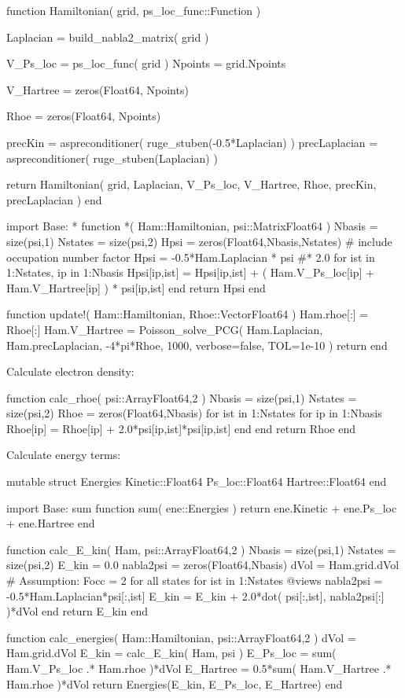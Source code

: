 \begin{juliacode}
function Hamiltonian( grid, ps_loc_func::Function )
    
  Laplacian = build_nabla2_matrix( grid )
    
  V_Ps_loc = ps_loc_func( grid )
  Npoints = grid.Npoints
    
  V_Hartree = zeros(Float64, Npoints)

  Rhoe = zeros(Float64, Npoints)

  precKin = aspreconditioner( ruge_stuben(-0.5*Laplacian) )
  precLaplacian = aspreconditioner( ruge_stuben(Laplacian) )
    
  return Hamiltonian( grid, Laplacian, V_Ps_loc, V_Hartree, Rhoe, precKin, precLaplacian )
end
\end{juliacode}


\begin{juliacode}
import Base: *
function *( Ham::Hamiltonian, psi::Matrix{Float64} )
  Nbasis = size(psi,1)
  Nstates = size(psi,2)
  Hpsi = zeros(Float64,Nbasis,Nstates)
  # include occupation number factor
  Hpsi = -0.5*Ham.Laplacian * psi #* 2.0
  for ist in 1:Nstates, ip in 1:Nbasis
    Hpsi[ip,ist] = Hpsi[ip,ist] + ( Ham.V_Ps_loc[ip] + Ham.V_Hartree[ip] ) * psi[ip,ist]
  end
  return Hpsi
end
\end{juliacode}

\begin{juliacode}
function update!( Ham::Hamiltonian, Rhoe::Vector{Float64} )
  Ham.rhoe[:] = Rhoe[:]
  Ham.V_Hartree = Poisson_solve_PCG(
      Ham.Laplacian, Ham.precLaplacian, -4*pi*Rhoe, 1000,
      verbose=false, TOL=1e-10
  )
  return
end
\end{juliacode}

Calculate electron density:
\begin{juliacode}
function calc_rhoe( psi::Array{Float64,2} )
  Nbasis = size(psi,1)
  Nstates = size(psi,2)
  Rhoe = zeros(Float64,Nbasis)
  for ist in 1:Nstates
    for ip in 1:Nbasis
      Rhoe[ip] = Rhoe[ip] + 2.0*psi[ip,ist]*psi[ip,ist]
    end
  end
  return Rhoe
end
\end{juliacode}

Calculate energy terms:
\begin{juliacode}
mutable struct Energies
  Kinetic::Float64
  Ps_loc::Float64
  Hartree::Float64
end

import Base: sum
function sum( ene::Energies )
  return ene.Kinetic + ene.Ps_loc + ene.Hartree
end

function calc_E_kin( Ham, psi::Array{Float64,2} )
  Nbasis = size(psi,1)
  Nstates = size(psi,2)
  E_kin = 0.0
  nabla2psi = zeros(Float64,Nbasis)
  dVol = Ham.grid.dVol
  # Assumption: Focc = 2 for all states
  for ist in 1:Nstates
    @views nabla2psi = -0.5*Ham.Laplacian*psi[:,ist]
    E_kin = E_kin + 2.0*dot( psi[:,ist], nabla2psi[:] )*dVol
  end
  return E_kin
end

function calc_energies( Ham::Hamiltonian, psi::Array{Float64,2} )
  dVol = Ham.grid.dVol
  E_kin = calc_E_kin( Ham, psi )
  E_Ps_loc = sum( Ham.V_Ps_loc .* Ham.rhoe )*dVol
  E_Hartree = 0.5*sum( Ham.V_Hartree .* Ham.rhoe )*dVol
  return Energies(E_kin, E_Ps_loc, E_Hartree)
end
\end{juliacode}

